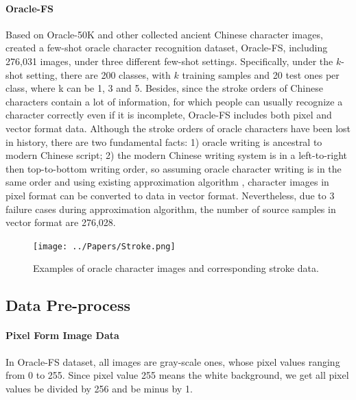 \documentclass{article}
\begin{document}
\paragraph{Oracle-FS}
Based on Oracle-50K and other collected ancient Chinese character images, \cite{Orc-BERT} created a few-shot oracle character recognition dataset, Oracle-FS, including 276,031 images, under three different few-shot settings. 
Specifically, under the $k$-shot setting, there are 200 classes, with $k$ training samples and 20 test ones per class, where k can be 1, 3 and 5.
Besides, since the stroke orders of Chinese characters contain a lot of information, for which people can usually recognize a character correctly even if it is incomplete, Oracle-FS includes both pixel and vector format data.
Although the stroke orders of oracle characters have been lost in history, there are two fundamental facts: 1) oracle writing is ancestral to modern Chinese script; 2) the modern Chinese writing system is in a left-to-right then top-to-bottom writing order, so assuming oracle character writing is in the same order and using existing approximation algorithm \citep{Handwriting}, character images in pixel format can be converted to data in vector format.  
Nevertheless, due to 3 failure cases during approximation algorithm, the number of source samples in vector format are 276,028.

\begin{figure}[h]
	\centering
	\texttt{[image: ../Papers/Stroke.png]}
	\caption{Examples of oracle character images and corresponding stroke data.}
	\label{fig:stroke}
\end{figure}

\subsection{Data Pre-process}

\paragraph{Pixel Form Image Data}
In Oracle-FS dataset, all images are gray-scale ones, whose pixel values ranging from 0 to 255. Since pixel value 255 means the white background, we get all pixel values be divided by 256 and be minus by 1.
\end{document}
